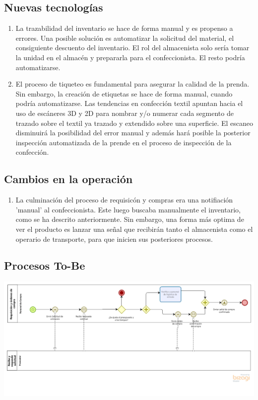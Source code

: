 \documentclass[11pt]{article}
\begin{document}
\subsection{Nuevas tecnologías}
\label{sec:orgdc8bc20}

\begin{enumerate}
\item La trazabilidad del inventario se hace de forma manual y es propenso
a errores. Una posible solución es automatizar la solicitud del material,
el consiguiente descuento del inventario. El rol del almacenista solo sería
tomar la unidad en el almacén y prepararla para el confeccionista. El
resto podría automatizarse.




\item El proceso de tiqueteo es fundamental para asegurar la calidad de la
prenda. Sin embargo, la creación de etiquetas se hace de forma manual,
cuando podría automatizarse. Las tendencias en confección textil
apuntan hacia el uso de escáneres 3D y 2D para nombrar y/o numerar
cada segmento de trazado sobre el textil ya trazado y extendido
sobre una superficie. El escaneo disminuirá la posibilidad del
error manual y además hará posible la posterior inspección automatizada
de la prende en el proceso de inspección de la confección.
\end{enumerate}


\subsection{Cambios en la operación}
\label{sec:org1d647b7}

\begin{enumerate}
\item La culminación del proceso de requisicón y compras era una notifiación
'manual' al confeccionista. Este luego buscaba manualmente el inventario,
como se ha descrito anteriormente. Sin embargo, una forma más optima de ver
el producto es lanzar una señal que recibirán tanto el almacenista
como el operario de transporte, para que inicien sus posteriores procesos.
\end{enumerate}



\subsection{Procesos To-Be}
\label{sec:orga70728b}

\begin{center}
\includegraphics[width=.9\linewidth]{./assets/build/to_be/requisicion_compra.png}
\end{center}
\end{document}
